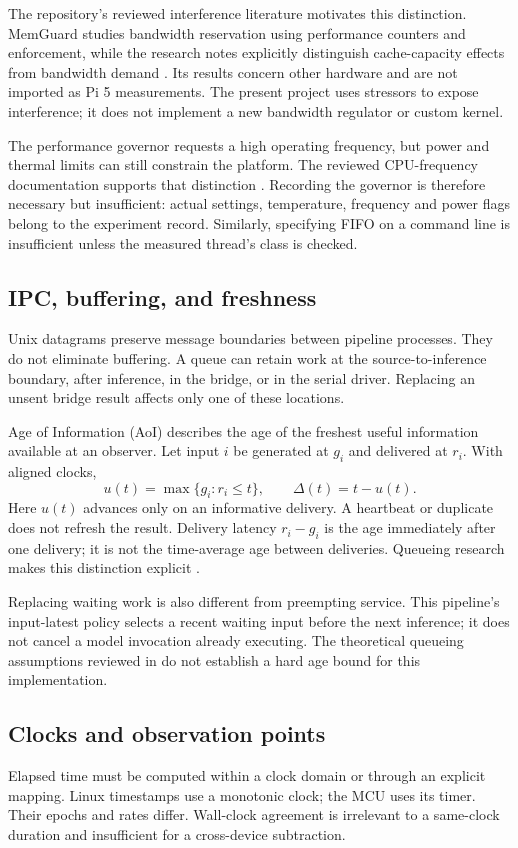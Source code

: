 \documentclass[a4paper,11pt]{article}
\newcommand{\page}{\clearpage}
\begin{document}
The repository's reviewed interference literature motivates this distinction. MemGuard studies bandwidth reservation using performance counters and enforcement, while the research notes explicitly distinguish cache-capacity effects from bandwidth demand \cite{memguard}. Its results concern other hardware and are not imported as Pi 5 measurements. The present project uses stressors to expose interference; it does not implement a new bandwidth regulator or custom kernel.

The performance governor requests a high operating frequency, but power and thermal limits can still constrain the platform. The reviewed CPU-frequency documentation supports that distinction \cite{cpufreq}. Recording the governor is therefore necessary but insufficient: actual settings, temperature, frequency and power flags belong to the experiment record. Similarly, specifying FIFO on a command line is insufficient unless the measured thread's class is checked.
\subsection{IPC, buffering, and freshness}
Unix datagrams preserve message boundaries between pipeline processes. They do not eliminate buffering. A queue can retain work at the source-to-inference boundary, after inference, in the bridge, or in the serial driver. Replacing an unsent bridge result affects only one of these locations.

Age of Information (AoI) describes the age of the freshest useful information available at an observer. Let input $i$ be generated at $g_i$ and delivered at $r_i$. With aligned clocks,
\begin{equation}
u(t)=\max\{g_i:r_i\leq t\},\qquad \Delta(t)=t-u(t).
\end{equation}
Here $u(t)$ advances only on an informative delivery. A heartbeat or duplicate does not refresh the result. Delivery latency $r_i-g_i$ is the age immediately after one delivery; it is not the time-average age between deliveries. Queueing research makes this distinction explicit \cite{aoi}.

Replacing waiting work is also different from preempting service. This pipeline's input-latest policy selects a recent waiting input before the next inference; it does not cancel a model invocation already executing. The theoretical queueing assumptions reviewed in  do not establish a hard age bound for this implementation.
\page
\subsection{Clocks and observation points}
Elapsed time must be computed within a clock domain or through an explicit mapping. Linux timestamps use a monotonic clock; the MCU uses its timer. Their epochs and rates differ. Wall-clock agreement is irrelevant to a same-clock duration and insufficient for a cross-device subtraction.
\end{document}
